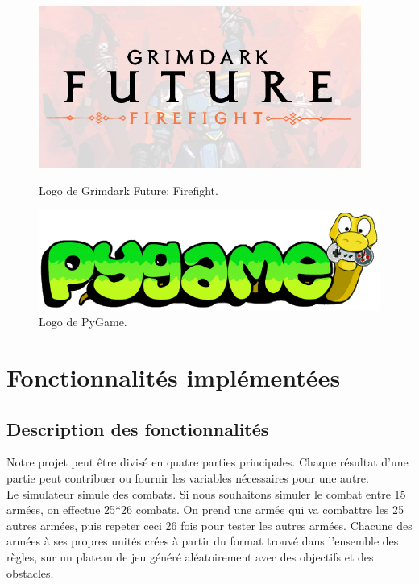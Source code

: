 \documentclass[a4paper, 11pt]{article}
\begin{document}
\begin{figure}[h]

	\centering
	\includegraphics[scale=0.4]{grimdark}
	\caption{Logo de Grimdark Future: Firefight.}

	\includegraphics[scale=0.4]{Pygame}
	\caption{Logo de PyGame.}
\end{figure}

\newpage

\section{Fonctionnalités implémentées}

\subsection{Description des fonctionnalités}

Notre projet peut être divisé en quatre parties principales. Chaque résultat d'une partie peut contribuer ou fournir les variables nécessaires pour une autre. \\

Le simulateur simule des combats. Si nous souhaitons simuler le combat entre 15 armées, on effectue 25*26 combats. On prend une armée qui va combattre les 25 autres armées, puis repeter ceci 26 fois pour tester les autres armées. Chacune des armées à ses propres unités crées à partir du format trouvé dans l'ensemble des règles, sur un plateau de jeu généré aléatoirement avec des objectifs et des obstacles. \\
\end{document}
